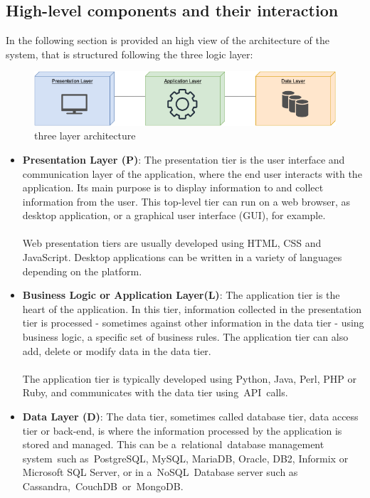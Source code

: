 \subsection{High-level components and their interaction}
In the following section is provided an high view of the architecture of the system, that is structured following the three logic layer:\\

\begin{figure}[H]
    \begin{center}
    \includegraphics[width=1.2\textwidth]{images/System architecture.png}
    \caption{three layer architecture}
    \label{fig:system architecture}
    \end{center}
\end{figure}

\begin{itemize}
    \item \textbf{Presentation Layer (P)}: The presentation tier is the user interface and communication layer of the application, where the end user interacts with the application. Its main purpose is to display information to and collect information from the user. This top-level tier can run on a web browser, as desktop application, or a graphical user interface (GUI), for example. \\ \\Web presentation tiers are usually developed using HTML, CSS and JavaScript. Desktop applications can be written in a variety of languages depending on the platform.
    \item \textbf{Business Logic or Application Layer(L)}: The application tier is the heart of the application. In this tier, information collected in the presentation tier is processed - sometimes against other information in the data tier - using business logic, a specific set of business rules. The application tier can also add, delete or modify data in the data tier.\\ \\The application tier is typically developed using Python, Java, Perl, PHP or Ruby, and communicates with the data tier using API calls. 
    \item \textbf{Data Layer (D)}: The data tier, sometimes called database tier, data access tier or back-end, is where the information processed by the application is stored and managed. This can be a relational database management system such as PostgreSQL, MySQL, MariaDB, Oracle, DB2, Informix or Microsoft SQL Server, or in a NoSQL Database server such as Cassandra, CouchDB or MongoDB. 
\end{itemize}

